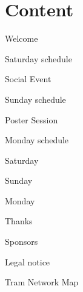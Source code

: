 \section*{Content}
\newlength\contentspace
\setlength\contentspace{\contentspace}

\vspace*{\contentspace}%
\noindent Welcome\dotfill \pageref{welcome}
%
%
%

\vspace*{\contentspace}%
\noindent Saturday schedule \dotfill \pageref{saturday}

\vspace*{\contentspace}%
\noindent Social Event \dotfill \pageref{social-event}

\vspace*{\contentspace}%
\noindent Sunday schedule \dotfill \pageref{sunday}

\vspace*{\contentspace}%
\noindent Poster Session \dotfill \pageref{poster-event}

\vspace*{\contentspace}%
\noindent Monday schedule \dotfill \pageref{monday}

\vspace*{\contentspace}%
\noindent Saturday \dotfill \pageref{saturday-descriptions}

\vspace*{\contentspace}%
\noindent Sunday \dotfill \pageref{sunday-descriptions}

\vspace*{\contentspace}%
\noindent Monday \dotfill \pageref{monday-descriptions}

\vspace*{\contentspace}%
\noindent Thanks \dotfill \pageref{thanks}

\vspace*{\contentspace}%
\noindent Sponsors \dotfill \pageref{sponsors}

\vspace*{\contentspace}%
\noindent Legal notice \dotfill \pageref{legal}

\vspace*{\contentspace}%
\noindent Tram Network Map \dotfill \pageref{public-transport-map}

